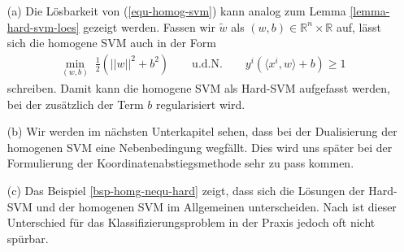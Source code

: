 \begin{bemerkung}
\begin{itemize}
\item[(a)] Die Lösbarkeit von (\ref{equ-homog-svm}) kann analog zum Lemma \ref{lemma-hard-svm-loes} gezeigt werden. 
Fassen wir $\tilde{w}$ als $(w,b) \in \mathbb{R}^n \times \mathbb{R}$ auf, lässt sich die homogene SVM auch in der Form
$$
\begin{aligned}
\min_{(w,b)} \; \frac{1}{2} \left( ||w||^2 + b^2 \right) \qquad
\text{u.d.N.} \qquad  y^i (\langle x^i, w \rangle +b) \geq 1
\end{aligned}
$$
schreiben. Damit kann die homogene SVM als Hard-SVM aufgefasst werden, bei der zusätzlich der Term $b$ regularisiert wird.
\item[(b)] Wir werden im nächsten Unterkapitel sehen, dass bei der Dualisierung der homogenen SVM eine Nebenbedingung wegfällt. Dies wird uns später bei der Formulierung der Koordinatenabstiegsmethode sehr zu pass kommen.
\item[(c)] Das Beispiel \ref{bsp-homg-nequ-hard} zeigt, dass sich die Lösungen der Hard-SVM und der homogenen SVM im Allgemeinen unterscheiden. Nach \cite{sb-umlfta} ist dieser Unterschied für das Klassifizierungsproblem in der Praxis jedoch oft nicht spürbar.
\end{itemize}
\end{bemerkung}
 
